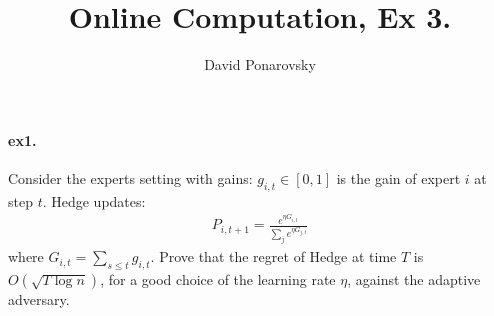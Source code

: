 \documentclass{article}
\newcommand{\expp}[1]{ \mathbf{E} \left[ {#1} \right]}
\begin{document}
\newcommand{\dalg}[1]{\expp{#1 : \text{alg} \sim \tilde{\text{alg}}}}
\newcommand{\dsig}[1]{\expp{#1 : \sigma \sim \tilde{\sigma}}}
\newcommand{\calg}{c_{\text{alg}}}
\newcommand{\cbase}{c_{\text{base}}}


\title{Online Computation, Ex 3.} 
\author{David Ponarovsky}
\maketitle

\begin{multicols*}{2}
  \paragraph{ex1.} Consider the experts setting with gains: $g_{i,t} \in \left[ 0,1 \right]$ is the gain of expert $i$ at step $t$. Hedge updates:  
  \begin{equation*}
    \begin{split}
      P_{i,t+1}= \frac{e^{\eta G_{i,t}}}{\sum_{j}{ e^{\eta G_{j,t}}} }
    \end{split}
  \end{equation*} where $G_{i,t} = \sum_{s\le t}{g_{i,t}} $. Prove that the regret of Hedge at time $T$ is $O\left( \sqrt{T\log n} \right)$, for a good choice of the learning rate $\eta$, against the adaptive adversary.  

\end{multicols*}
\end{document}
